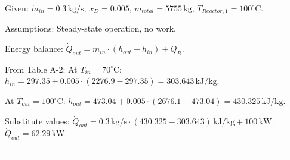 Given:  
\( \dot{m}_{in} = 0.3 \, \text{kg/s} \), \( x_D = 0.005 \), \( m_{total} = 5755 \, \text{kg} \), \( T_{Reactor,1} = 100^\circ \text{C} \).  

Assumptions:  
Steady-state operation, no work.  

Energy balance:  
\( \dot{Q}_{out} = \dot{m}_{in} \cdot (h_{out} - h_{in}) + \dot{Q}_R \).  

From Table A-2:  
At \( T_{in} = 70^\circ \text{C} \):  
\( h_{in} = 297.35 + 0.005 \cdot (2276.9 - 297.35) = 303.643 \, \text{kJ/kg} \).  

At \( T_{out} = 100^\circ \text{C} \):  
\( h_{out} = 473.04 + 0.005 \cdot (2676.1 - 473.04) = 430.325 \, \text{kJ/kg} \).  

Substitute values:  
\( \dot{Q}_{out} = 0.3 \, \text{kg/s} \cdot (430.325 - 303.643) \, \text{kJ/kg} + 100 \, \text{kW} \).  
\( \dot{Q}_{out} = 62.29 \, \text{kW} \).  

---